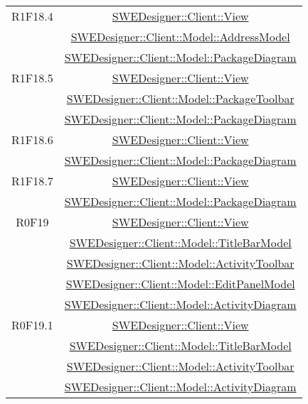 \documentclass[../SpecificaTecnica.tex]{subfiles}
\begin{document}
\begin{longtable}{|c|c|}
		R1F18.4 & \hyperlink{SWEDesigner::Client::View}{SWEDesigner::Client::View} \\& \hyperlink{SWEDesigner::Client::Model::AddressModel}{SWEDesigner::Client::Model::AddressModel} \\& \hyperlink{SWEDesigner::Client::Model::PackageDiagram}{SWEDesigner::Client::Model::PackageDiagram}\\\hline
		R1F18.5 & \hyperlink{SWEDesigner::Client::View}{SWEDesigner::Client::View} \\& \hyperlink{SWEDesigner::Client::Model::PackageToolbar}{SWEDesigner::Client::Model::PackageToolbar} \\& \hyperlink{SWEDesigner::Client::Model::PackageDiagram}{SWEDesigner::Client::Model::PackageDiagram} \\\hline
		R1F18.6 & \hyperlink{SWEDesigner::Client::View}{SWEDesigner::Client::View} \\& \hyperlink{SWEDesigner::Client::Model::PackageDiagram}{SWEDesigner::Client::Model::PackageDiagram} \\\hline
		R1F18.7 & \hyperlink{SWEDesigner::Client::View}{SWEDesigner::Client::View} \\& \hyperlink{SWEDesigner::Client::Model::PackageDiagram}{SWEDesigner::Client::Model::PackageDiagram} \\\hline
		R0F19 & \hyperlink{SWEDesigner::Client::View}{SWEDesigner::Client::View} \\& \hyperlink{SWEDesigner::Client::Model::TitleBarModel}{SWEDesigner::Client::Model::TitleBarModel} \\& \hyperlink{SWEDesigner::Client::Model::ActivityToolbar}{SWEDesigner::Client::Model::ActivityToolbar} \\& \hyperlink{SWEDesigner::Client::Model::EditPanelModel}{SWEDesigner::Client::Model::EditPanelModel} \\& \hyperlink{SWEDesigner::Client::Model::ActivityDiagram}{SWEDesigner::Client::Model::ActivityDiagram}\\\hline
		R0F19.1 & \hyperlink{SWEDesigner::Client::View}{SWEDesigner::Client::View} \\& \hyperlink{SWEDesigner::Client::Model::TitleBarModel}{SWEDesigner::Client::Model::TitleBarModel} \\& \hyperlink{SWEDesigner::Client::Model::ActivityToolbar}{SWEDesigner::Client::Model::ActivityToolbar} \\& \hyperlink{SWEDesigner::Client::Model::ActivityDiagram}{SWEDesigner::Client::Model::ActivityDiagram}\\\hline

\end{longtable}
\end{document}
